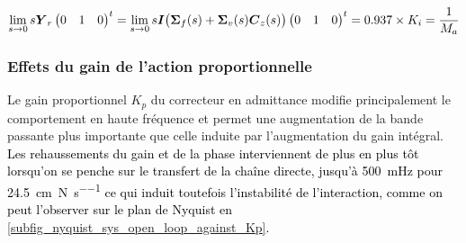 \begin{equation} \label{eq_mass_Ki}
	\lim_{s\to0} s\matr{Y}_r \begin{pmatrix}
		0 & 1 & 0
	\end{pmatrix}^t =\lim_{s\to0} s\matr{I}\big(\matr{\Sigma}_f(s) + \matr{\Sigma}_v(s) \matr{C}_z(s)\big) \begin{pmatrix}
		0 & 1 & 0
	\end{pmatrix}^t = 0.937\times K_i = \frac{1}{M_a}%
\end{equation}

%



\subsubsection{Effets du gain de l'action proportionnelle}

Le gain proportionnel $K_p$ du correcteur en admittance modifie principalement le comportement en haute fréquence et permet une augmentation de la bande passante plus importante que celle induite par l'augmentation du gain intégral. \textcolor{black}{Les rehaussements du gain et de la phase interviennent de plus en plus tôt lorsqu'on se penche sur le transfert de la chaîne directe, jusqu'à \SI{500}{\milli\hertz} pour \SI{24.5}{\centi\meter\per\newton\per\second} ce qui induit toutefois l'instabilité de l'interaction, comme on peut l'observer sur le plan de Nyquist en \cref{subfig_nyquist_sys_open_loop_against_Kp}.}

